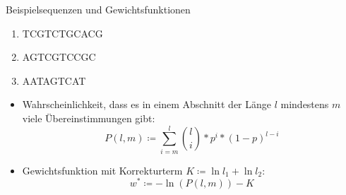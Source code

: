 \documentclass[wide,xcolor={x11names},hyperref={colorlinks=false},pantone312]{beamer}
\begin{document}
\begin{frame}[t]{Beispielsequenzen und Gewichtsfunktionen}
	\begin{enumerate}
		\ttfamily
		\item TCGTCTGCACG
		\item AGTCGTCCGC
		\item AATAGTCAT
		\normalfont
	\end{enumerate}
	\begin{itemize}
		\item Wahrscheinlichkeit, dass es in einem Abschnitt der Länge $l$ mindestens $m$ viele Übereinstimmungen gibt: 
			\begin{equation}
				P(l,m) \coloneqq \sum_{i=m}^{l} {l \choose i} * p^i * (1-p)^{l-i}
			\end{equation}
		\item Gewichtsfunktion mit Korrekturterm $K \coloneqq \ln{l_1} + \ln{l_2}$: 
			\begin{equation}
				w^* \coloneqq -\ln(P(l,m)) - K
			\end{equation}
		\cite{MAHD98}
	\end{itemize}
\end{frame}
\end{document}
